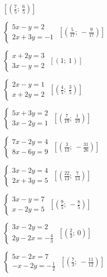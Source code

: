 \begin{esercizio}[\Ast]
\begin{multicols}{2}
\begin{enumeratea}
 \hfill $\left[\left(\frac{7}{5};~\frac{6}{5}\right)\right]$
\item $\left\{\begin{array}{l}5x-y=2\\2x+3y=-1 \end{array}\right.$
 \hfill $\left[\left(\frac{5}{17};~-\frac{9}{17}\right)\right]$
\item $\left\{\begin{array}{l}x+2y=3 \\3x-y=2\end{array}\right.$
 \hfill $\left[(1;~1)\right]$
\item $\left\{\begin{array}{l}2x-y=1 \\x+2y=2\end{array}\right.$
 \hfill $\left[\left(\frac{4}{5};~\frac{3}{5}\right)\right]$
\item $\left\{\begin{array}{l}5x+3y=2 \\3x-2y=1\end{array}\right.$
 \hfill $\left[\left(\frac{7}{19};~\frac{1}{19}\right)\right]$
\item $\left\{\begin{array}{l}7x-2y=4\\8x-6y=9 \end{array}\right.$
 \hfill $\left[\left(\frac{3}{13};~-\frac{31}{26}\right)\right]$
\item $\left\{\begin{array}{l}3x-2y=4 \\2x+3y=5\end{array}\right.$
 \hfill $\left[\left(\frac{22}{13};~\frac{7}{13}\right)\right]$
\item $\left\{\begin{array}{l}3x-y=7 \\x-2y=5 \end{array}\right.$
 \hfill $\left[\left(\frac{9}{5};~-\frac{8}{5}\right)\right]$
\item $\left\{\begin{array}{l}3x-2y=2\\2y-2x=-{\frac{4}{3}} \end{array}\right.$
 \hfill $\left[(\frac{2}{3};~0)\right]$
\item $\left\{\begin{array}{l}5x-2x=7\\-x-2y=-{\frac{1}{2}} \end{array}\right.$
 \hfill $\left[\left(\frac{7}{3};~-\frac{11}{12}\right)\right]$

\end{enumeratea}
\end{multicols}
\end{esercizio}
